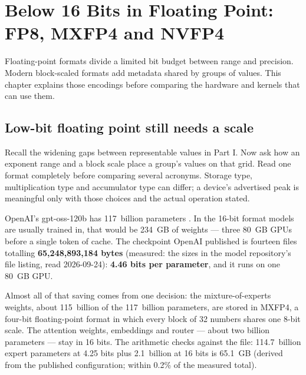 \chapter{Below 16 Bits in Floating Point: FP8, MXFP4 and NVFP4}\label{ch:low-precision-float}

\begin{ChapterIntent}
Floating-point formats divide a limited bit budget between range and precision. Modern
block-scaled formats add metadata shared by groups of values. This chapter explains
those encodings before comparing the hardware and kernels that can use them.
\end{ChapterIntent}

\section*{Low-bit floating point still needs a scale}
Recall the widening gaps between representable values in Part I. Now ask how an exponent
range and a block scale place a group's values on that grid. Read one format completely
before comparing several acronyms. Storage type, multiplication type and accumulator
type can differ; a device's advertised peak is meaningful only with those choices and
the actual operation stated.


OpenAI's gpt-oss-120b has 117~billion parameters \cite{openai2025gptoss}. In
the 16-bit format models are usually trained in, that would be 234~GB of
weights --- three 80~GB GPUs before a single token of cache. The checkpoint
OpenAI published is fourteen files totalling \textbf{65,248,893,184 bytes}
(measured: the sizes in the model repository's file listing, read 2026-09-24):
\textbf{4.46 bits per parameter}, and it runs on one 80~GB GPU.

Almost all of that saving comes from one decision: the mixture-of-experts
weights, about 115~billion of the 117~billion parameters, are stored in
MXFP4, a four-bit floating-point format in which every block of 32 numbers
shares one 8-bit scale. The attention weights, embeddings and router ---
about two billion parameters --- stay in 16 bits. The arithmetic checks
against the file: 114.7~billion expert parameters at 4.25 bits plus 2.1~billion
at 16 bits is 65.1~GB (derived from the published configuration; within 0.2\%
of the measured total).

